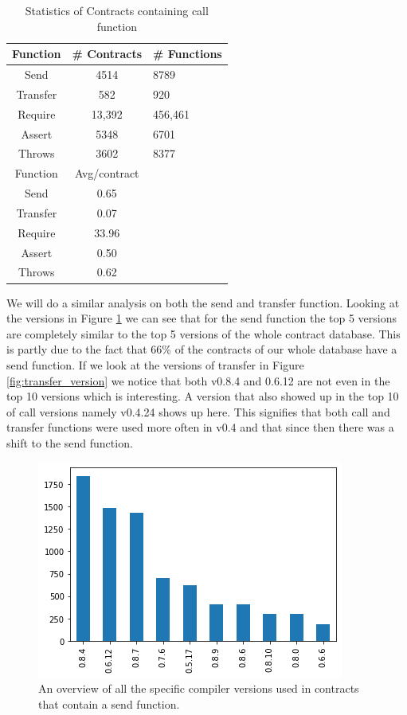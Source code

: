 \documentclass[10pt,conference]{IEEEtran}
\begin{document}
\begin{table}
  \caption{Statistics of Contracts containing call function}
  \label{tab:call}
  \begin{tabular}{ccl}
    \hline
    Function & \# Contracts & \# Functions\\
    \hline
    Send&4514&8789\\
    Transfer&582&920\\
    Require&13,392&456,461\\
    Assert&5348&6701\\
    Throws&3602&8377\\
    \hline
    Function & Avg/contract\\
    \hline
    Send&0.65\\
    Transfer&0.07\\
    Require&33.96\\
    Assert&0.50\\
    Throws&0.62\\
  \hline
\end{tabular}
\end{table}

We will do a similar analysis on both the send and transfer function. Looking at the versions in Figure \ref{fig:send_version} we can see that for the send function the top 5 versions are completely similar to the top 5 versions of the whole contract database. This is partly due to the fact that 66\% of the contracts of our whole database have a send function. If we look at the versions of transfer in Figure \ref{fig:transfer_version} we notice that both v0.8.4 and 0.6.12 are not even in the top 10 versions which is interesting. A version that also showed up in the top 10 of call versions namely v0.4.24 shows up here. This signifies that both call and transfer functions were used more often in v0.4 and that since then there was a shift to the send function. 

\begin{figure}[h]
  \centering
  \includegraphics[width=\linewidth]{img/send_versions_clean.png}
  \caption{An overview of all the specific compiler versions used in contracts that contain a send function. }
  \label{fig:send_version}
\end{figure}
\end{document}
